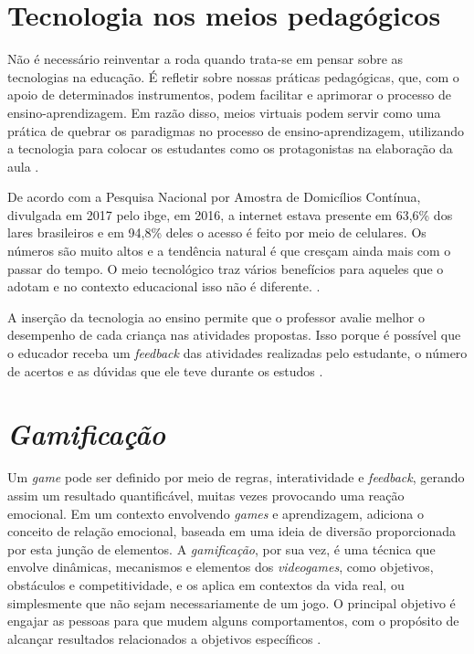 \section{Tecnologia nos meios pedagógicos}
Não é necessário reinventar a roda quando trata-se em pensar sobre as tecnologias na educação. É refletir sobre nossas práticas pedagógicas, que, com o apoio de determinados instrumentos, podem facilitar e aprimorar o processo de ensino-aprendizagem. Em razão disso, meios virtuais podem servir como uma prática de quebrar os paradigmas no processo de ensino-aprendizagem, utilizando a tecnologia para colocar os estudantes como os protagonistas na elaboração da aula \cite{tecnologias-todas-e-todos:2019}.

De acordo com a Pesquisa Nacional por Amostra de Domicílios Contínua, divulgada em 2017 pelo \ac{ibge}, em 2016, a internet estava presente em 63,6\% dos lares brasileiros e em 94,8\% deles o acesso é feito por meio de celulares. Os números são muito altos e a tendência natural é que cresçam ainda mais com o passar do tempo. O meio tecnológico traz vários benefícios para aqueles que o adotam e no contexto educacional isso não é diferente. \cite{importancia-tecnologia-atual:2019}.

A inserção da tecnologia ao ensino permite que o professor avalie melhor o desempenho de cada criança nas atividades propostas. Isso porque é possível que o educador receba um \textit{\gls{feedback}} das atividades realizadas pelo estudante, o número de acertos e as dúvidas que ele teve durante os estudos \cite{importancia-beneficios-tecnologia:2020}.


\section{\textit{Gamificação}}
Um \textit{game} pode ser definido por meio de regras, interatividade e \textit{\gls{feedback}}, gerando assim um resultado quantificável, muitas vezes provocando uma reação emocional. Em um contexto envolvendo \textit{games} e aprendizagem, \cite{gamification-of-learning:2012} adiciona o conceito de relação emocional, baseada em uma ideia de diversão proporcionada por esta junção de elementos.
A \textit{gamificação}, por sua vez, é uma técnica que envolve dinâmicas, mecanismos e elementos dos \textit{videogames}, como objetivos, obstáculos e competitividade, e os aplica em contextos da vida real, ou simplesmente que não sejam necessariamente de um jogo. O principal objetivo é engajar as pessoas para que mudem alguns comportamentos, com o propósito de alcançar resultados relacionados a objetivos específicos \cite{gamificação-na-ead:2014}.


